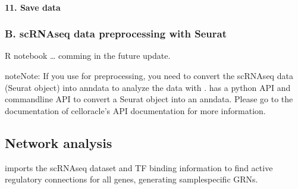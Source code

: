 \documentclass[letterpaper,10pt,english]{sphinxmanual}
\begin{document}
\paragraph{11. Save data}
\label{\detokenize{notebooks/03_scRNA-seq_data_preprocessing/scanpy_preprocessing_with_Paul_etal_2015_data:11.-Save-data}}
{
\begin{sphinxVerbatim}[commandchars=\\\{\}]
\llap{\color{nbsphinxin}[32]:\,\hspace{\fboxrule}\hspace{\fboxsep}}
\end{sphinxVerbatim}
}


\subsubsection{B. scRNA\sphinxhyphen{}seq data preprocessing with Seurat}
\label{\detokenize{tutorials/scrnaprocess:b-scrna-seq-data-preprocessing-with-seurat}}
R notebook … comming in the future update.

\begin{sphinxadmonition}{note}{Note:}
If you use  for preprocessing, you need to convert the scRNA\sphinxhyphen{}seq data (Seurat object) into anndata to analyze the data with .
 has a python API and command\sphinxhyphen{}line API to convert a Seurat object into an anndata.
Please go to the documentation of celloracle’s API documentation for more information.
\end{sphinxadmonition}


\subsection{Network analysis}
\label{\detokenize{tutorials/networkanalysis:network-analysis}}\label{\detokenize{tutorials/networkanalysis:networkanalysis}}\label{\detokenize{tutorials/networkanalysis::doc}}
 imports the scRNA\sphinxhyphen{}seq dataset and TF binding information to find active regulatory connections for all genes, generating sample\sphinxhyphen{}specific GRNs.
\end{document}
